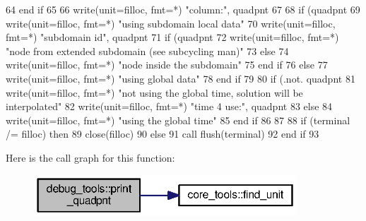 \begin{DoxyCode}
64 \textcolor{keywordflow}{      end if}
65       
66       \textcolor{keyword}{write}(unit=filloc, fmt=*) \textcolor{stringliteral}{"column:"}, quadpnt%
67       
68       \textcolor{keywordflow}{if} (quadpnt%
69         \textcolor{keyword}{write}(unit=filloc, fmt=*) \textcolor{stringliteral}{"using subdomain local data"}
70         \textcolor{keyword}{write}(unit=filloc, fmt=*) \textcolor{stringliteral}{"subdomain id"}, quadpnt%
71         \textcolor{keywordflow}{if} (quadpnt%
72           \textcolor{keyword}{write}(unit=filloc, fmt=*) \textcolor{stringliteral}{"node from extended subdomain (see subcycling man)"}
73         \textcolor{keywordflow}{else}
74           \textcolor{keyword}{write}(unit=filloc, fmt=*) \textcolor{stringliteral}{"node inside the subdomain"}
75 \textcolor{keywordflow}{        end if}
76       \textcolor{keywordflow}{else}
77         \textcolor{keyword}{write}(unit=filloc, fmt=*) \textcolor{stringliteral}{"using global data"}
78 \textcolor{keywordflow}{      end if}
79       
80       \textcolor{keywordflow}{if} (.not. quadpnt%
81         \textcolor{keyword}{write}(unit=filloc, fmt=*) \textcolor{stringliteral}{"not using the global time, solution will be interpolated"}
82         \textcolor{keyword}{write}(unit=filloc, fmt=*) \textcolor{stringliteral}{"time 4 use:"}, quadpnt%
83       \textcolor{keywordflow}{else}
84         \textcolor{keyword}{write}(unit=filloc, fmt=*) \textcolor{stringliteral}{"using the global time"}
85 \textcolor{keywordflow}{      end if}
86       
87   
88       \textcolor{keywordflow}{if} (terminal /= filloc) \textcolor{keywordflow}{then}
89         \textcolor{keyword}{close}(filloc)
90       \textcolor{keywordflow}{else}
91         \textcolor{keyword}{call }flush(terminal)
92 \textcolor{keywordflow}{      end if}
93       
\end{DoxyCode}


Here is the call graph for this function\+:\nopagebreak
\begin{figure}[H]
\begin{center}
\leavevmode
\includegraphics[width=278pt]{namespacedebug__tools_a0e007cc1eb7b04282f1f55c1a3b2e4fc_cgraph}
\end{center}
\end{figure}



